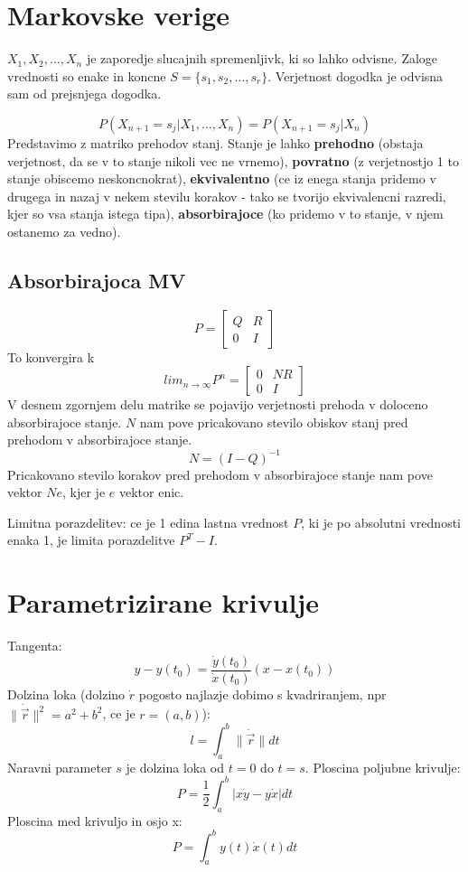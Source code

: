\documentclass[a4paper,11pt]{article}
\begin{document}
\newpage
\section{Markovske verige}
\(X_1, X_2, \ldots, X_n\) je zaporedje slucajnih spremenljivk, ki so lahko odvisne.
Zaloge vrednosti so enake in koncne \(S = \{s_1 , s_2 , \ldots , s_r \}\). Verjetnost dogodka je odvisna sam od prejsnjega dogodka.

\[P(X_{n+1} = s_j | X_1,\ldots,X_n) = P(X_{n+1} = s_j | X_n)\]
Predstavimo z matriko prehodov stanj. Stanje je lahko \textbf{prehodno} (obstaja verjetnost, da se v to stanje nikoli vec ne vrnemo), \textbf{povratno} (z verjetnostjo 1 to stanje obiscemo neskoncnokrat), \textbf{ekvivalentno} (ce iz enega stanja pridemo v drugega in nazaj v nekem stevilu korakov - tako se tvorijo ekvivalencni razredi, kjer so vsa stanja istega tipa), \textbf{absorbirajoce} (ko pridemo v to stanje, v njem ostanemo za vedno).
\subsection{Absorbirajoca MV}
\[P = \begin{bmatrix}
	Q & R \\
	0 & I
	\end{bmatrix}
\]
To konvergira k
\[lim_{n \to \infty} P^n = \begin{bmatrix}
	0 & N R \\
	0 & I
	\end{bmatrix}
\]
V desnem zgornjem delu matrike se pojavijo verjetnosti prehoda v doloceno absorbirajoce stanje. \(N\) nam pove pricakovano stevilo obiskov stanj pred prehodom v absorbirajoce stanje.
\[N = (I-Q)^{-1}\]
Pricakovano stevilo korakov pred prehodom v absorbirajoce stanje nam pove vektor \(Ne\), kjer je \(e\) vektor enic.

Limitna porazdelitev: ce je 1 edina lastna vrednost \(P\), ki je po absolutni vrednosti enaka 1, je limita porazdelitve \(P^T - I\).


\section{Parametrizirane krivulje}
Tangenta: \[y - y(t_0) = \frac{\dot{y}(t_0)}{\dot{x}(t_0)} (x - x(t_0))\]
Dolzina loka (dolzino \(\dot{r}\) pogosto najlazje dobimo s kvadriranjem, npr \(\|\dot{\vec{r}}\|^2 = a^2 + b^2\), ce je \(r = (a,b)\)): \[l = \int_{a}^{b} \|\dot{\vec{r}}\|dt\]
Naravni parameter \(s\) je dolzina loka od \(t=0\) do \(t=s\).
Ploscina poljubne krivulje: \[P = \frac{1}{2} \int_{a}^{b} |x \dot{y} - y \dot{x}| dt\]
Ploscina med krivuljo in osjo x:\[P = \int_{a}^{b} y(t) \dot{x}(t) dt\]
\end{document}
